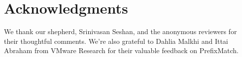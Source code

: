 
\smallskip 

\section*{Acknowledgments}

We thank our shepherd, Srinivasan Seshan, and the anonymous reviewers for their thoughtful comments. We're also grateful to Dahlia Malkhi and Ittai Abraham from VMware Research for their valuable feedback on PrefixMatch.

\flushcolsend